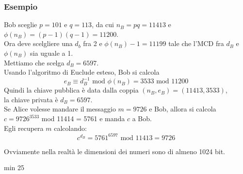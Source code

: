 \subsubsection*{Esempio}
Bob sceglie $p=101$ e $q=113$, da cui $n_B=pq=11413$ e $\phi(n_B) = (p-1)(q-1) = 11200$.\\
Ora deve scelgliere una $d_b$ fra 2 e $\phi(n_B) - 1 =11199$ tale che l'MCD fra $d_B$ e $\phi(n_B)$ sia uguale a 1.\\
Mettiamo che scelga $d_B=6597$.\\
Usando l'algoritmo di Euclude esteso, Bob si calcola
\begin{equation*}
	e_B \equiv d_B^{-1} \text{ mod } \phi(n_B) = 3533 \text { mod } 11200
\end{equation*}
Quindi la chiave pubblica è data dalla coppia $(n_B, e_B) = (11413, 3533)$,\\
la chiave privata è $d_B=6597$.\\

Se Alice volesse mandare il messaggio $m=9726$ e Bob, allora si calcola $c=9726^{3533}$ mod 11414 = 5761 e manda $c$ a Bob.\\
Egli recupera $m$ calcolando:
\begin{equation*}
	c^{d_B} = 5761^{6597} \text{ mod } 11413 = 9726
\end{equation*}

Ovviamente nella realtà le dimensioni dei numeri sono di almeno 1024 bit.

min 25





